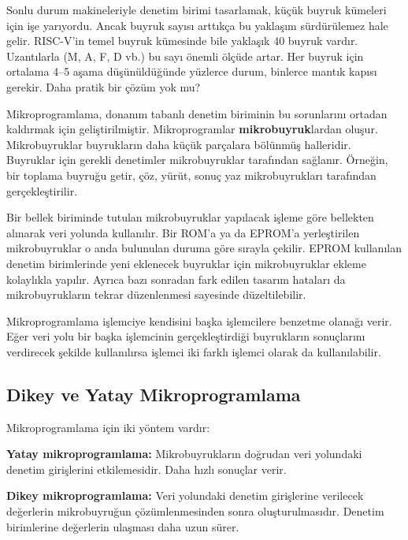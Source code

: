 Sonlu durum makineleriyle denetim birimi tasarlamak, küçük buyruk kümeleri için işe yarıyordu. Ancak buyruk sayısı arttıkça bu yaklaşım sürdürülemez hale gelir. RISC-V'in temel buyruk kümesinde bile yaklaşık 40 buyruk vardır. Uzantılarla (M, A, F, D vb.) bu sayı önemli ölçüde artar. Her buyruk için ortalama 4--5 aşama düşünüldüğünde yüzlerce durum, binlerce mantık kapısı gerekir. Daha pratik bir çözüm yok mu?

Mikroprogramlama, donanım tabanlı denetim biriminin bu sorunlarını ortadan kaldırmak için geliştirilmiştir. Mikroprogramlar \textbf{mikrobuyruk}lardan oluşur. Mikrobuyruklar buyrukların daha küçük parçalara bölünmüş halleridir. Buyruklar için gerekli denetimler mikrobuyruklar tarafından sağlanır. Örneğin, bir toplama buyruğu getir, çöz, yürüt, sonuç yaz mikrobuyrukları tarafından gerçekleştirilir.

Bir bellek biriminde tutulan mikrobuyruklar yapılacak işleme göre bellekten alınarak veri yolunda kullanılır. Bir ROM'a ya da EPROM'a yerleştirilen mikrobuyruklar o anda bulunulan duruma göre sırayla çekilir. EPROM kullanılan denetim birimlerinde yeni eklenecek buyruklar için mikrobuyruklar ekleme kolaylıkla yapılır. Ayrıca bazı sonradan fark edilen tasarım hataları da mikrobuyrukların tekrar düzenlenmesi sayesinde düzeltilebilir.

Mikroprogramlama işlemciye kendisini başka işlemcilere benzetme olanağı verir. Eğer veri yolu bir başka işlemcinin gerçekleştirdiği buyrukların sonuçlarını verdirecek şekilde kullanılırsa işlemci iki farklı işlemci olarak da kullanılabilir.

\subsection{Dikey ve Yatay Mikroprogramlama}
\label{subsec:dikey-yatay}

Mikroprogramlama için iki yöntem vardır:

\begin{tanim}
\textbf{Yatay mikroprogramlama:} Mikrobuyrukların doğrudan veri yolundaki denetim girişlerini etkilemesidir. Daha hızlı sonuçlar verir.

\textbf{Dikey mikroprogramlama:} Veri yolundaki denetim girişlerine verilecek değerlerin mikrobuyruğun çözümlenmesinden sonra oluşturulmasıdır. Denetim birimlerine değerlerin ulaşması daha uzun sürer.
\end{tanim}


